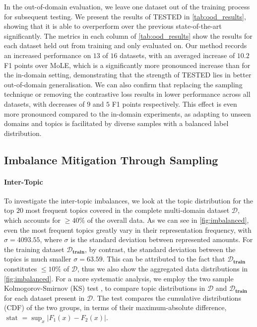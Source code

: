 \documentclass[11pt]{article}
\begin{document}
In the out-of-domain evaluation, we leave one dataset out of the training process for subsequent testing. We present the results of TESTED in \autoref{tab:ood_results}, showing that it is able to overperform over the previous state-of-the-art significantly. The metrics in each column of \autoref{tab:ood_results} show the results for each dataset held out from training and only evaluated on. Our method records an increased performance on $13$ of $16$ datasets, with an averaged increase of $10.2$ F1 points over MoLE, which is a significantly more pronounced increase than for the in-domain setting, demonstrating that the strength of TESTED lies in better out-of-domain generalisation. We can also confirm that replacing the sampling technique or removing the contrastive loss results in lower performance across all datasets, with decreases of $9$ and $5$ F1 points respectively. This effect is even more pronounced compared to the in-domain experiments, as adapting to unseen domains and topics is facilitated by diverse samples with a balanced label distribution.  


\subsection{Imbalance Mitigation Through Sampling}
\label{subsec:imbalance}
\paragraph{Inter-Topic}
To investigate the inter-topic imbalances, we look at the topic distribution for the top $20$ most frequent topics covered in the complete multi-domain dataset $\mathcal{D}$, which accounts for $\geq 40 \%$ of the overall data. As we can see in  \autoref{fig:imbalanced}, even the most frequent topics greatly vary in their representation frequency, with $\sigma = 4093.55$, where $\sigma$ is the standard deviation between represented amounts. For the training dataset $\mathcal{D}_\textbf{train}$, by contrast, the standard deviation between the topics is much smaller $\sigma = 63.59$. This can be attributed to the fact that $\mathcal{D}_\textbf{train}$ constitutes  $\leq10\%$ of $\mathcal{D}$, thus we also show the aggregated data distributions in \autoref{fig:imbalanced}. 
For a more systematic analysis, we employ the two sample Kolmogorov-Smirnov (KS) test \citep{kalmagorov}, to compare topic distributions in $\mathcal{D}$ and $\mathcal{D}_\textbf{train}$  for each dataset present in $\mathcal{D}$. The test compares the cumulative distributions (CDF) of the two groups, in terms of their maximum-absolute difference, $\text { stat }=\sup _x\left|F_1(x)-F_2(x)\right|$.
\end{document}
